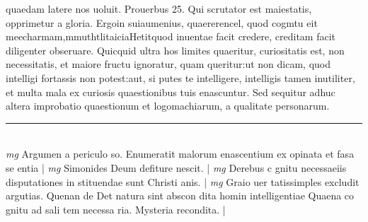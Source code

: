 \documentclass{article}
\begin{document}
\begin{pages}
quaedam latere nos uoluit. Prouerbus 25. Qui scrutator est maiestatis, opprimetur a gloria. Ergoin suiaumenius, quaererencel, quod cogmtu eit meecharmam,mmuthtlitaiciaHetitquod inuentae facit credere, creditam facit diligenter obseruare. Quicquid ultra hos limites quaeritur, curiositatis est, non necessitatis, et maiore fructu ignoratur, quam queritur:ut non dicam, quod intelligi fortassis non potest:aut, si putes te intelligere, intelligis tamen inutiliter, et multa mala ex curiosis quaestionibus tuis enascuntur. Sed sequitur adhuc altera improbatio quaestionum et logomachiarum, a qualitate personarum.  \pend
\vspace{0.5cm}\noindent
\vspace{0.2cm}\rule{1cm}{0.2pt}\\ 
\hspace{0.2cm}\textit{mg}
\footnotesize Argumen a periculo so. Enumeratit malorum enascentium ex opinata et fasa se entia 
\normalsize| 
\hspace{0.2cm}\textit{mg}
\footnotesize Simonides Deum defiture nescit. 
\normalsize| 
\hspace{0.2cm}\textit{mg}
\footnotesize Derebus c gnitu necessaeiis disputationes in stituendae sunt Christi anis. 
\normalsize| 
\hspace{0.2cm}\textit{mg}
\footnotesize Graio uer tatissimples excludit argutias. Quenan de Det natura sint abscon dita homin intelligentiae Quaena co gnitu ad sali tem necessa ria. Mysteria recondita. 
\normalsize| 

\end{pages}
\end{document}
